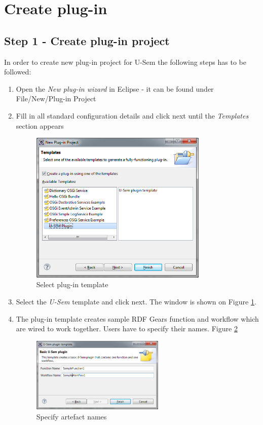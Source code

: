 \section{Create plug-in}

\subsection{Step 1 - Create plug-in project}
	In order to create new plug-in project for U-Sem the following steps has to be followed:
	\begin{enumerate}
		\item Open the \textit{New plug-in wizard} in Eclipse - it can be found under File/New/Plug-in Project
		\item Fill in all standard configuration details and click next until the \textit{Templates} section appears

\begin{figure}
  \centering
    \includegraphics[width=0.8\textwidth]{apendix/PluginTutorial/wiz_templ.png}
    \caption{Select plug-in template}
    \label{templ}
\end{figure}

		\item Select the \textit{U-Sem} template and click next. The window is shown on Figure \ref{templ}.
		\item The plug-in template creates sample RDF Gears function and workflow which are wired to work together. Users have to specify their names. Figure \ref{art}
		
\begin{figure}
  \centering
    \includegraphics[width=0.6\textwidth]{apendix/PluginTutorial/wiz_art.png}
    \caption{Specify artefact names}
    \label{art}
\end{figure}


\end{enumerate}
